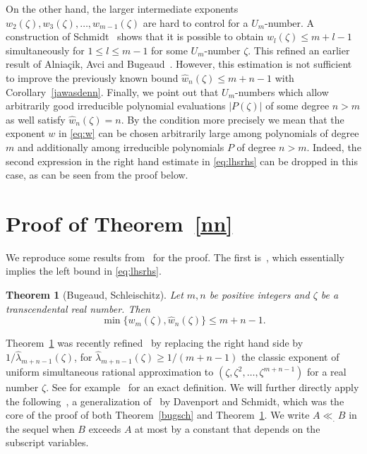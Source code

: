 \documentclass[12pt]{amsart}
\newtheorem{theorem}{Theorem}[section]
\theoremstyle{definition}
\begin{document}
On the other hand, the larger intermediate exponents $w_{2}(\zeta), w_{3}(\zeta),\ldots, w_{m-1}(\zeta)$ 
are hard to control for a $U_{m}$-number.
A construction of
Schmidt~\cite{schmidl} shows that it is possible to obtain
$w_{l}(\zeta)\leq m+l-1$ simultaneously for $1\leq l\leq m-1$
for some $U_{m}$-number $\zeta$. This refined
an earlier result of Alnia\c{c}ik, Avci and Bugeaud~\cite{alni}.   
However, this estimation is not sufficient to improve the previously known bound $\widehat{w}_{n}(\zeta)\leq m+n-1$
with Corollary~\ref{jawasdenn}.
Finally, we point out that $U_{m}$-numbers which allow arbitrarily good irreducible
polynomial evaluations $\vert P(\zeta)\vert$ of some degree $n>m$
as well satisfy $\widehat{w}_{n}(\zeta)=n$. By the condition
more precisely we mean that the exponent $w$ in \eqref{eq:w} can be chosen arbitrarily large among polynomials of degree $m$ and
additionally among irreducible polynomials $P$ of degree $n>m$.
Indeed, the second expression in the right hand estimate in \eqref{eq:lhsrhs} 
can be dropped in this case, as can be seen from the proof below.


\section{Proof of Theorem~\ref{nn}} \label{proofs}

We reproduce some results from~\cite{buschl} for the proof.
The first is~\cite[Theorem~2.3]{buschl}, which essentially implies the left bound in \eqref{eq:lhsrhs}.

\begin{theorem}[Bugeaud, Schleischitz]  \label{lutz}
Let $m,n$ be positive integers and $\zeta$ be a transcendental real number. Then 
\[
\min \{ w_{m}(\zeta), \widehat{w}_{n}(\zeta) \} \leq m+n-1.
\]
\end{theorem} 

Theorem~\ref{lutz} was recently refined~\cite{ichindag} by replacing the right hand side by
$1/\widehat{\lambda}_{m+n-1}(\zeta)$, for $\widehat{\lambda}_{m+n-1}(\zeta)\geq 1/(m+n-1)$ the classic 
exponent of uniform simultaneous rational approximation 
to $(\zeta,\zeta^{2},\ldots,\zeta^{m+n-1})$ 
for a real number $\zeta$. See for example~\cite{bug2010} for 
an exact definition.
We will further directly apply the following~\cite[Lemma~3.1]{buschl}, a generalization of~\cite[Lemma~8]{davsh}
by Davenport and Schmidt, which was the core of the proof 
of both Theorem~\ref{bugsch} and Theorem~\ref{lutz}. We write $A\ll_{.} B$ in the sequel when
$B$ exceeds $A$ at most by a constant that depends on the subscript variables. 
\end{document}
